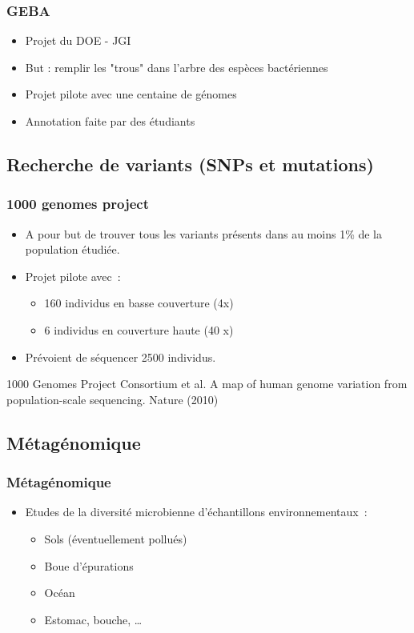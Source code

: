 \documentclass{beamer}
\begin{document}
\begin{frame}
	\frametitle{GEBA}
\begin{itemize}
\item Projet du DOE - JGI
\item But : remplir les "trous" dans l'arbre des espèces bactériennes
\item Projet pilote avec une centaine de génomes
\item Annotation faite par des étudiants
\end{itemize}
\end{frame}


\subsection{Recherche de variants (SNPs et mutations)} %
\label{sub:decouverte_de_variants}
\begin{frame}
	\frametitle{1000 genomes project}
\begin{itemize}
\item A pour but de trouver tous les variants présents dans au moins 1\% de la population étudiée.
\item Projet pilote avec~: 
\begin{itemize}
	\item 160 individus en basse couverture (4x) 
	\item 6 individus en couverture haute (40 x)
\end{itemize}
\item Prévoient de séquencer 2500 individus.
\end{itemize}
\small{1000 Genomes Project Consortium et al. A map of human genome variation from population-scale sequencing. Nature (2010)}
\end{frame}



\subsection{Métagénomique} %
\label{sub:métagénomique}

\begin{frame}
	\frametitle{Métagénomique}
\begin{itemize}
	\item Etudes de la diversité microbienne d'échantillons environnementaux~:
	\begin{itemize}
		\item Sols (éventuellement pollués)
		\item Boue d'épurations
		\item Océan
		\item Estomac, bouche, \ldots
	\end{itemize}
\end{itemize}
\end{frame}
\end{document}
